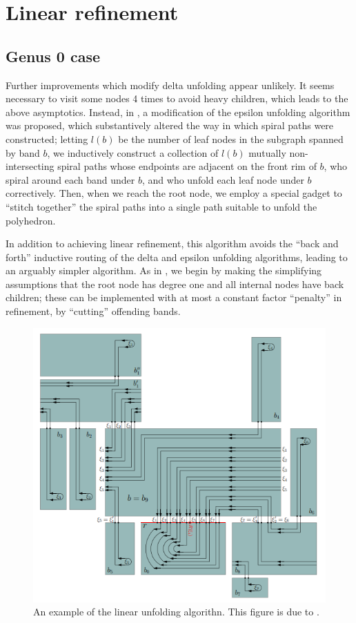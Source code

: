 \documentclass{article}
\begin{document}
\section{Linear refinement}\label{Linear section}
\subsection{Genus 0 case} \label{Linear zero subsection}
Further improvements which modify delta unfolding appear unlikely.
It seems necessary to visit some nodes 4 times to avoid heavy children, which leads to the above asymptotics.
Instead, in \cite{Chang_Yen}, a modification of the epsilon unfolding algorithm was proposed, which substantively altered the way in which spiral paths were constructed;
letting $l(b)$ be the number of leaf nodes in the subgraph spanned by band $b$, we inductively construct a collection of $l(b)$ mutually non-intersecting spiral paths whose endpoints are adjacent on the front rim of $b$, who spiral around each band under $b$, and who unfold each leaf node under $b$ correctively.
Then, when we reach the root node, we employ a special gadget to ``stitch together'' the spiral paths into a single path suitable to unfold the polyhedron.

In addition to achieving linear refinement, this algorithm avoids the ``back and forth'' inductive routing of the delta and epsilon unfolding algorithms, leading to an arguably simpler algorithm.
As in \cite{Damian_Demaine}, we begin by making the simplifying assumptions that the root node has degree one and all internal nodes have back children;
these can be implemented with at most a constant factor ``penalty'' in refinement, by ``cutting'' offending bands.

\begin{figure}
  \begin{center}
    \includegraphics[width=.6\textwidth]{./figs/Linear_unfolding.png}
  \end{center}
  \caption{
    An example of the linear unfolding algorithn.
    This figure is due to \cite[Fig. 4]{Damian_Demaine}.}\label{Linear unfolding figure}
\end{figure}
\end{document}

